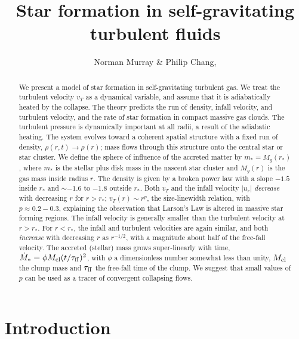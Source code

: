 \documentclass[iop,apj,numberedappendix]{emulateapj}
\newcommand       \tff          {\tau_{\rm ff}}
\begin{document}
\title{Star formation in self-gravitating turbulent fluids}
\author{Norman Murray \& Philip Chang,
  } 

\begin{abstract}
We present a model of star formation in self-gravitating turbulent
gas. We treat the turbulent velocity $v_T$ as a dynamical variable,
and assume that it is adiabatically heated by the collapse. The theory
predicts the run of density, infall velocity, and turbulent velocity,
and the rate of star formation in compact massive gas clouds. The
turbulent pressure is dynamically important at all radii, a result of
the adiabatic heating. The system evolves toward a coherent spatial
structure with a fixed run of density, $\rho(r,t)\to\rho(r)$; mass
flows through this structure onto the central star or star cluster.
We define the sphere of influence of the accreted matter by
$m_*=M_g(r_*)$, where $m_*$ is the stellar plus disk mass in the
nascent star cluster and $M_g(r)$ is the gas mass inside radius
$r$. The density is given by a broken power law with a slope $-1.5$
inside $r_*$ and $\sim -1.6$ to $-1.8$ outside $r_*$. Both $v_T$ and
the infall velocity $|u_r|$ {\em decrease} with decreasing $r$ for
$r>r_*$; $v_T(r)\sim r^p$, the size-linewidth relation, with
$p\approx0.2-0.3$, explaining the observation that Larson's Law is
altered in massive star forming regions. The infall velocity is
generally smaller than the turbulent velocity at $r>r_*$. For $r<r_*$,
the infall and turbulent velocities are again similar, and both {\em
  increase} with decreasing $r$ as $r^{-1/2}$, with a magnitude about
half of the free-fall velocity. The accreted (stellar) mass grows
super-linearly with time, $\dot M_*=\phi M_{\rm cl}(t/\tff)^2$, with
$\phi$ a dimensionless number somewhat less than unity, $M_{\rm cl}$
the clump mass and $\tff$ the free-fall time of the clump. We suggest
that small values of $p$ can be used as a tracer of convergent
collapsing flows.
\end{abstract}

\section{Introduction}
\label{sec:intro}
\end{document}
